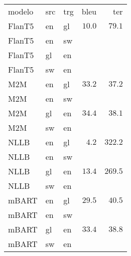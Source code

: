 \begin{tabular}{lllrr}
modelo & src & trg & bleu & ter \\
FlanT5 & en & gl & $10.0$ & $79.1$ \\
FlanT5 & en & sw &  &  \\
FlanT5 & gl & en &  &  \\
FlanT5 & sw & en &  &  \\
M2M & en & gl & $33.2$ & $37.2$ \\
M2M & en & sw &  &  \\
M2M & gl & en & $34.4$ & $38.1$ \\
M2M & sw & en &  &  \\
NLLB & en & gl & $4.2$ & $322.2$ \\
NLLB & en & sw &  &  \\
NLLB & gl & en & $13.4$ & $269.5$ \\
NLLB & sw & en &  &  \\
mBART & en & gl & $29.5$ & $40.5$ \\
mBART & en & sw &  &  \\
mBART & gl & en & $33.4$ & $38.8$ \\
mBART & sw & en &  &  \\
\end{tabular}
